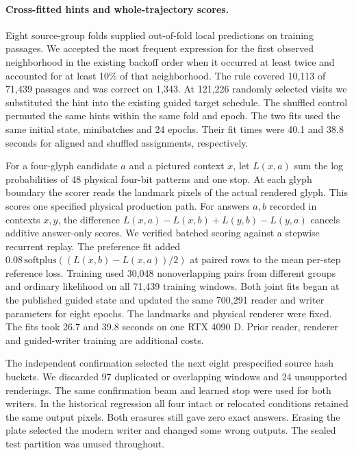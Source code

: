 \paragraph{Cross-fitted hints and whole-trajectory scores.}
Eight source-group folds supplied out-of-fold local predictions on training passages. We accepted the most frequent expression for the first observed neighborhood in the existing backoff order when it occurred at least twice and accounted for at least 10\% of that neighborhood. The rule covered 10,113 of 71,439 passages and was correct on 1,343. At 121,226 randomly selected visits we substituted the hint into the existing guided target schedule. The shuffled control permuted the same hints within the same fold and epoch. The two fits used the same initial state, minibatches and 24 epochs. Their fit times were 40.1 and 38.8 seconds for aligned and shuffled assignments, respectively.

For a four-glyph candidate $a$ and a pictured context $x$, let $L(x,a)$ sum the log probabilities of 48 physical four-bit patterns and one stop. At each glyph boundary the scorer reads the landmark pixels of the actual rendered glyph. This scores one specified physical production path. For answers $a,b$ recorded in contexts $x,y$, the difference $L(x,a)-L(x,b)+L(y,b)-L(y,a)$ cancels additive answer-only scores. We verified batched scoring against a stepwise recurrent replay. The preference fit added $0.08\,\mathrm{softplus}((L(x,b)-L(x,a))/2)$ at paired rows to the mean per-step reference loss. Training used 30,048 nonoverlapping pairs from different groups and ordinary likelihood on all 71,439 training windows. Both joint fits began at the published guided state and updated the same 700,291 reader and writer parameters for eight epochs. The landmarks and physical renderer were fixed. The fits took 26.7 and 39.8 seconds on one RTX 4090 D. Prior reader, renderer and guided-writer training are additional costs.

The independent confirmation selected the next eight prespecified source hash buckets. We discarded 97 duplicated or overlapping windows and 24 unsupported renderings. The same confirmation beam and learned stop were used for both writers. In the historical regression all four intact or relocated conditions retained the same output pixels. Both erasures still gave zero exact answers. Erasing the plate selected the modern writer and changed some wrong outputs. The sealed test partition was unused throughout.
